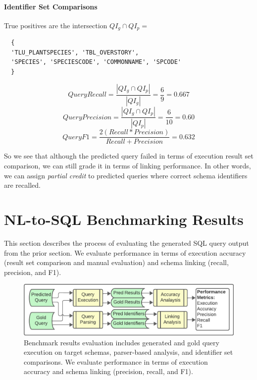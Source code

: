 \paragraph{Identifier Set Comparisons}

True positives are the intersection $QI_g \cap QI_p =$
\begin{verbatim}
  {
  'TLU_PLANTSPECIES', 'TBL_OVERSTORY',
  'SPECIES', 'SPECIESCODE', 'COMMONNAME', 'SPCODE'
  }
\end{verbatim}

$$QueryRecall = \frac{|QI_g \cap QI_p|}{|QI_g|} = \frac{6}{9} = 0.667$$
$$QueryPrecision = \frac{|QI_g \cap QI_p|}{|QI_p|} = \frac{6}{10} = 0.60$$
$$QueryF1 = \frac{2(Recall*Precision)}{Recall+Precision} = 0.632$$

So we see that although the predicted query failed in terms of execution result set comparison, we can still grade it in terms of linking performance.
In other words, we can assign \emph{partial credit} to predicted queries where correct schema identifiers are recalled.





\section{NL-to-SQL Benchmarking Results}

\label{section:nl-to-sql-benchmarking-results}

This section describes the process of evaluating the generated SQL query output from the prior section.
We evaluate performance in terms of execution accuracy (result set comparison and manual evaluation) and schema linking (recall, precision, and F1).

\begin{figure}[!h]
  \centering
  \includegraphics[width=\figwidthmod\linewidth]{figures/section-6-process-header.pdf}
  \caption{Benchmark results evaluation includes generated and gold query execution on target schemas, parser-based analysis, and identifier set comparisons. We evaluate performance in terms of execution accuracy and schema linking (precision, recall, and F1).}
\end{figure}

